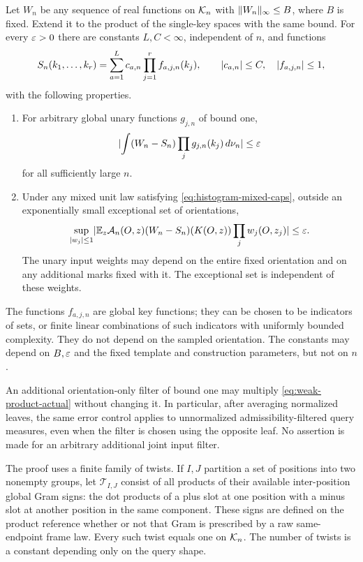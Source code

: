 \begin{theorem}\label{thm:weak-product}
Let $W_n$ be any sequence of real functions on $\mathcal K_n$ with
$\lVert W_n\rVert_\infty\le B$, where $B$ is fixed. Extend it to the product
of the single-key spaces with the same bound. For every $\varepsilon>0$
there are constants $L,C<\infty$, independent of $n$, and functions
\begin{equation}\label{eq:weak-product-approximant}
 S_n(k_1,\ldots,k_r)
   =\sum_{a=1}^{L}c_{a,n}\prod_{j=1}^{r}f_{a,j,n}(k_j),
 \qquad
 \lvert c_{a,n}\rvert\le C,\quad \lvert f_{a,j,n}\rvert\le1,
\end{equation}
with the following properties.
\begin{enumerate}[label=(\roman*)]
\item For arbitrary global unary functions $g_{j,n}$ of bound one,
\begin{equation}\label{eq:weak-product-reference}
 \lvert \int(W_n-S_n)\prod_jg_{j,n}(k_j)\,d\nu_n\rvert\le\varepsilon
\end{equation}
for all sufficiently large $n$.
\item Under any mixed unit law satisfying
\eqref{eq:histogram-mixed-caps}, outside an exponentially small
exceptional set of orientations,
\begin{equation}\label{eq:weak-product-actual}
 \sup_{\lvert w_j\rvert\le1}
 \lvert \mathbb E_z\mathcal A_n(O,z)
       (W_n-S_n)(K(O,z))\prod_jw_j(O,z_j)\rvert\le\varepsilon.
\end{equation}
The unary input weights may depend on the entire fixed orientation
and on any additional marks fixed with it. The exceptional set is
independent of these weights.
\end{enumerate}
The functions $f_{a,j,n}$ are global key functions; they can be chosen
to be indicators of sets, or finite linear combinations of such
indicators with uniformly bounded complexity. They do not depend on
the sampled orientation. The constants may depend on $B,\varepsilon$ and
the fixed template and construction parameters, but not on $n$.

An additional orientation-only filter of bound one may multiply
\eqref{eq:weak-product-actual} without changing it. In particular,
after averaging normalized leaves, the same error control applies to
unnormalized admissibility-filtered query measures, even when the
filter is chosen using the opposite leaf. No assertion is made for
an arbitrary additional joint input filter.
\end{theorem}

The proof uses a finite family of twists. If $I,J$ partition a set of
positions into two nonempty groups, let $\mathcal T_{I,J}$ consist of
all products of their available inter-position global Gram signs:
the dot products of a plus slot at one position with a minus slot at
another position in the same component. These signs are defined on
the product reference whether or not that Gram is prescribed by a
raw same-endpoint frame law. Every such twist equals one on
$\mathcal K_n$. The number of twists is a constant depending only on the
query shape.

